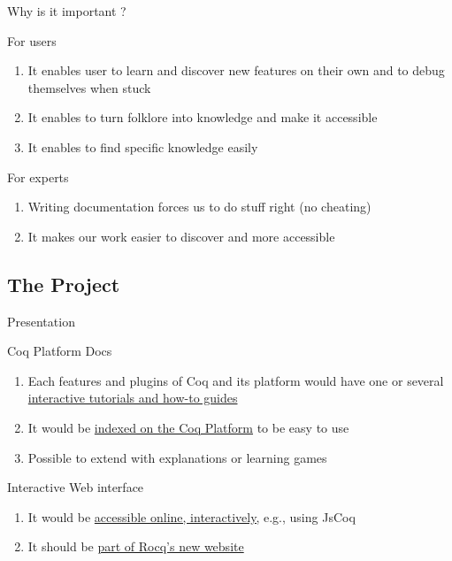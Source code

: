 \documentclass[10pt]{beamer}
\begin{document}
\begin{frame}{Why is it important ?}
  \begin{tcbProp}{For users}
    \begin{enumerate}
      \item It enables user to learn and discover new features on their own and
            to debug themselves when stuck
      \item<2-> It enables to turn folklore into knowledge and make it accessible
      \item<3-> It enables to find specific knowledge easily
    \end{enumerate}
  \end{tcbProp}
  \begin{tcbProp}{For experts}
    \begin{enumerate}
      \item Writing documentation forces us to do stuff right (no cheating)
      \item It makes our work easier to discover and more accessible
    \end{enumerate}
  \end{tcbProp}
\end{frame}

\subsection{The Project}

\begin{frame}{Presentation}
  \begin{tcbObj}{Coq Platform Docs}
    \begin{enumerate}
      \item<1-> Each features and plugins of Coq and its platform would have one
            or several \ul{interactive tutorials and how-to guides}
      \item<2-> It would be \ul{indexed on the Coq Platform} to be easy to use
      \item<3-> Possible to extend with explanations or learning games
    \end{enumerate}
  \end{tcbObj}
  \begin{tcbObj}{Interactive Web interface}
    \begin{enumerate}
      \item<5-> It would be \ul{accessible online, interactively,} e.g., using JsCoq
      \item<6-> It should be \ul{part of Rocq's new website}
    \end{enumerate}
  \end{tcbObj}
\end{frame}
\end{document}
